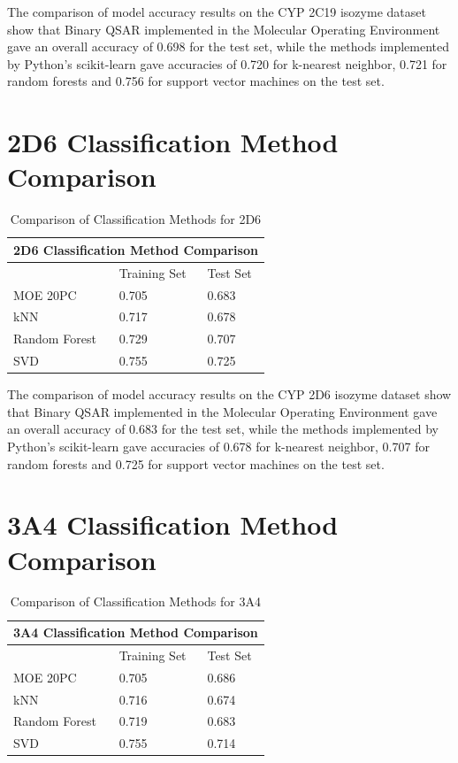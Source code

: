The comparison of model accuracy results on the CYP 2C19 isozyme dataset show that Binary QSAR implemented in the Molecular Operating Environment gave an overall accuracy of 0.698 for the test set, while the methods implemented by Python's scikit-learn gave accuracies of 0.720 for k-nearest neighbor, 0.721 for random forests and 0.756 for support vector machines on the test set.

\section{2D6 Classification Method Comparison}

\begin{table}[H]
\caption{Comparison of Classification Methods for 2D6}
\centering
\begin{tabular}{|l|l|l|}
\hline
\multicolumn{3}{|c|}{2D6 Classification Method Comparison} \\ \hline
          & Training Set & Test Set \\ \hline
MOE 20PC  & 0.705        & 0.683    \\ \hline
kNN       & 0.717        & 0.678    \\ \hline
Random Forest & 0.729    & 0.707    \\ \hline
SVD       & 0.755        & 0.725    \\ \hline
\end{tabular}
\end{table}

The comparison of model accuracy results on the CYP 2D6 isozyme dataset show that Binary QSAR implemented in the Molecular Operating Environment gave an overall accuracy of 0.683 for the test set, while the methods implemented by Python's scikit-learn gave accuracies of 0.678 for k-nearest neighbor, 0.707 for random forests and 0.725 for support vector machines on the test set.


\section{3A4 Classification Method Comparison}

\begin{table}[H]
\caption{Comparison of Classification Methods for 3A4}
\centering
\begin{tabular}{|l|l|l|}
\hline
\multicolumn{3}{|c|}{3A4 Classification Method Comparison} \\ \hline
          & Training Set & Test Set \\ \hline
MOE 20PC  & 0.705        & 0.686    \\ \hline
kNN       & 0.716        & 0.674    \\ \hline
Random Forest & 0.719    & 0.683    \\ \hline
SVD       & 0.755        & 0.714    \\ \hline
\end{tabular}
\end{table}

